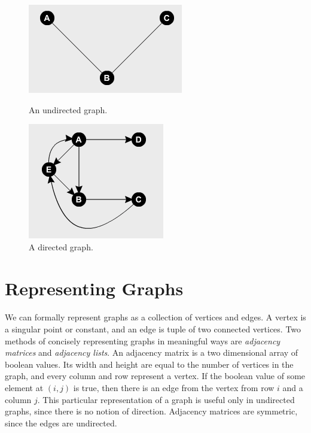 \documentclass{article}
\begin{document}
\begin{figure}[H]
    \centering
    \begin{minipage}{.45\textwidth}
        \centering
        \includegraphics[width=.6\linewidth, height=.2\textheight]{undirected_graph}
        \caption{An undirected graph.}
    \end{minipage}
    \begin{minipage}{.45\textwidth}
        \centering
        \includegraphics[width=.5\linewidth, height=.2\textheight]{directed_graph}
        \caption{A directed graph.}
    \end{minipage}
\end{figure}

\section*{Representing Graphs}
\paragraph{}
We can formally represent graphs as a collection of vertices and edges. A vertex is a singular point or constant, and an edge is tuple of two connected vertices. Two methods of concisely representing graphs in meaningful ways are \textit{adjacency matrices} and \textit{adjacency lists}. An adjacency matrix is a two dimensional array of boolean values. Its width and height are equal to the number of vertices in the graph, and every column and row represent a vertex. If the boolean value of some element at $(i,j)$ is true, then there is an edge from the vertex from row $i$ and a column $j$. This particular representation of a graph is useful only in undirected graphs, since there is no notion of direction. Adjacency matrices are symmetric, since the edges are undirected.\\\\
\end{document}
